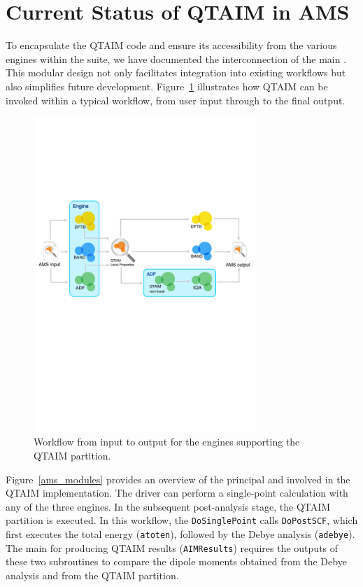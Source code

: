 \newpage
\section{Current Status of QTAIM in AMS}

To encapsulate the QTAIM code and ensure its accessibility from the various
engines within the suite, we have documented the interconnection of the main
\modules. This modular design not only facilitates integration into existing
workflows but also simplifies future development. Figure~\ref{ams_workflow}
illustrates how \gls{QTAIM} can be invoked within a typical \ams workflow, from
user input through to the final output.

\begin{figure}[h]
  \centering
  \includegraphics[width=0.75\textwidth]{diagramas/flux.pdf}
  \caption{Workflow from \ams input to output for the engines supporting the
    QTAIM partition.}
  \label{ams_workflow}
\end{figure}

Figure~\ref{ams_modules} provides an overview of the principal \subroutines and
\modules involved in the \gls{QTAIM} implementation. The \ams driver can perform a
single-point calculation with any of the three engines. In the subsequent
post-analysis stage, the \gls{QTAIM} partition is executed. In this workflow, the
\subroutine \texttt{DoSinglePoint} calls \texttt{DoPostSCF}, which first
executes the total energy \subroutine (\texttt{atoten}), followed by the Debye
analysis (\texttt{adebye}). The main \subroutine for producing
\gls{QTAIM} results (\texttt{AIMResults}) requires the outputs of these two
subroutines to compare the dipole moments obtained from the Debye analysis and
from the \gls{QTAIM} partition.


